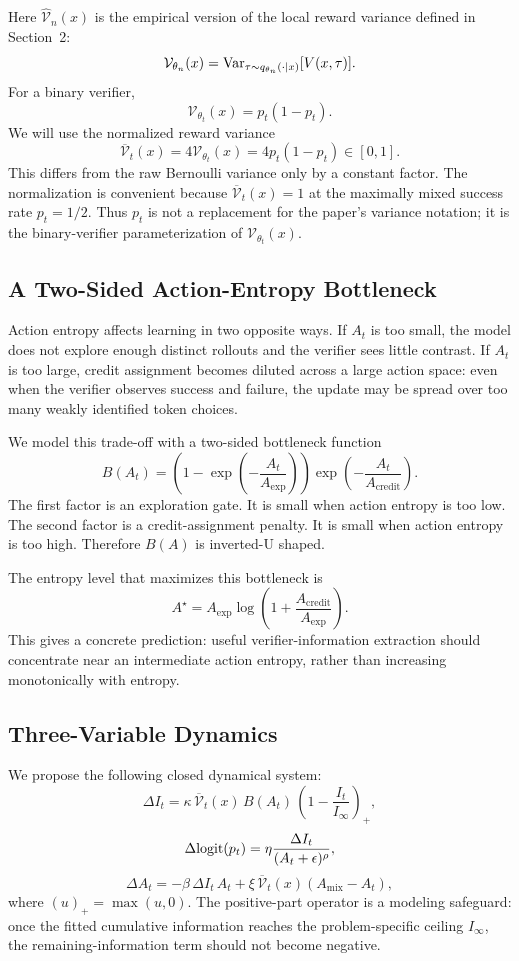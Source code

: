 Here $\widehat{\mathcal{V}}_n(x)$ is the empirical version of the local reward variance defined in Section~2:
\[
  \mathcal{V}_{\theta_n}(x)
  =
  \mathrm{Var}_{\tau\sim q_{\theta_n}(\cdot\mid x)}
  [V(x,\tau)].
\]
For a binary verifier,
\[
  \mathcal{V}_{\theta_t}(x)
  =
  p_t(1-p_t).
\]
We will use the normalized reward variance
\[
  \overline{\mathcal{V}}_t(x)
  =
  4\mathcal{V}_{\theta_t}(x)
  =
  4p_t(1-p_t)
  \in[0,1].
\]
This differs from the raw Bernoulli variance only by a constant factor. The normalization is convenient because $\overline{\mathcal{V}}_t(x)=1$ at the maximally mixed success rate $p_t=1/2$. Thus $p_t$ is not a replacement for the paper's variance notation; it is the binary-verifier parameterization of $\mathcal{V}_{\theta_t}(x)$.

\subsection{A Two-Sided Action-Entropy Bottleneck}

Action entropy affects learning in two opposite ways. If $A_t$ is too small, the model does not explore enough distinct rollouts and the verifier sees little contrast. If $A_t$ is too large, credit assignment becomes diluted across a large action space: even when the verifier observes success and failure, the update may be spread over too many weakly identified token choices.

We model this trade-off with a two-sided bottleneck function
\[
  B(A_t)
  =
  \left(1-\exp\left(-\frac{A_t}{A_{\mathrm{exp}}}\right)\right)
  \exp\left(-\frac{A_t}{A_{\mathrm{credit}}}\right).
\]
The first factor is an exploration gate. It is small when action entropy is too low. The second factor is a credit-assignment penalty. It is small when action entropy is too high. Therefore $B(A)$ is inverted-U shaped.

The entropy level that maximizes this bottleneck is
\[
  A^\star
  =
  A_{\mathrm{exp}}
  \log\left(1+\frac{A_{\mathrm{credit}}}{A_{\mathrm{exp}}}\right).
\]
This gives a concrete prediction: useful verifier-information extraction should concentrate near an intermediate action entropy, rather than increasing monotonically with entropy.

\subsection{Three-Variable Dynamics}

We propose the following closed dynamical system:
\[
  \Delta I_t
  =
  \kappa\,
  \overline{\mathcal{V}}_t(x)\,
  B(A_t)\,
  \left(1-\frac{I_t}{I_\infty}\right)_+,
\]
\[
  \Delta \mathrm{logit}(p_t)
  =
  \eta
  \frac{\Delta I_t}{(A_t+\epsilon)^\rho},
\]
\[
  \Delta A_t
  =
  -\beta\,\Delta I_t\,A_t
  +
  \xi\,\overline{\mathcal{V}}_t(x)(A_{\mathrm{mix}}-A_t),
\]
where $(u)_+=\max(u,0)$. The positive-part operator is a modeling safeguard: once the fitted cumulative information reaches the problem-specific ceiling $I_\infty$, the remaining-information term should not become negative.

